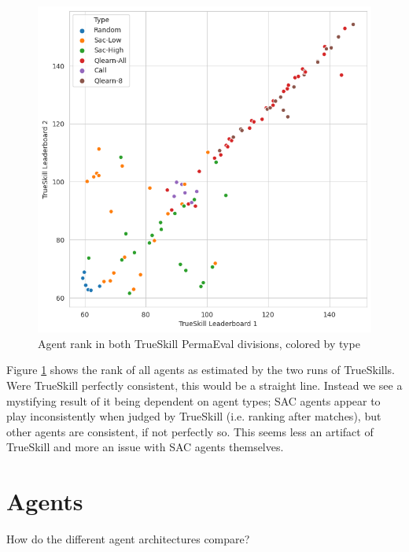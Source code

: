 \begin{figure}[H]
\centering
    \includegraphics[width=0.8\linewidth]{Results/figures/trueskill_comparison.png}
\caption{Agent rank in both TrueSkill PermaEval divisions, colored by type}
\label{TrueSkillCompare2}
\end{figure}

Figure \ref{TrueSkillCompare2} shows the rank of all agents as estimated by the two runs of TrueSkills. Were TrueSkill perfectly consistent, this would be a straight line. Instead we see a mystifying result of it being dependent on agent types; SAC agents appear to play inconsistently when judged by TrueSkill (i.e. ranking after matches), but other agents are consistent, if not perfectly so. This seems less an artifact of TrueSkill and more an issue with SAC agents themselves.

\section{Agents}
\label{ResultsAgents}
How do the different agent architectures compare?

